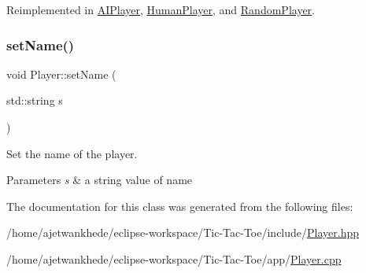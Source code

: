 Reimplemented in \mbox{\hyperlink{classAIPlayer_a4a431bc5cf71781bdd311b08c47d27dc}{A\+I\+Player}}, \mbox{\hyperlink{classHumanPlayer_a8281fe260b25edc4451fd15ae182707f}{Human\+Player}}, and \mbox{\hyperlink{classRandomPlayer_a4b252647e976a08c1717d8db78bec23d}{Random\+Player}}.

\mbox{\label{classPlayer_af832a5f872ae4975563c3c5519320361}} 
\subsubsection{\texorpdfstring{set\+Name()}{setName()}}
{\footnotesize\ttfamily void Player\+::set\+Name (\begin{DoxyParamCaption}\item[{std\+::string}]{s }\end{DoxyParamCaption})}



Set the name of the player. 


\begin{DoxyParams}{Parameters}
{\em s} & a string value of name \\
\hline
\end{DoxyParams}


The documentation for this class was generated from the following files\+:\begin{DoxyCompactItemize}
\item 
/home/ajetwankhede/eclipse-\/workspace/\+Tic-\/\+Tac-\/\+Toe/include/\mbox{\hyperlink{Player_8hpp}{Player.\+hpp}}\item 
/home/ajetwankhede/eclipse-\/workspace/\+Tic-\/\+Tac-\/\+Toe/app/\mbox{\hyperlink{Player_8cpp}{Player.\+cpp}}\end{DoxyCompactItemize}
